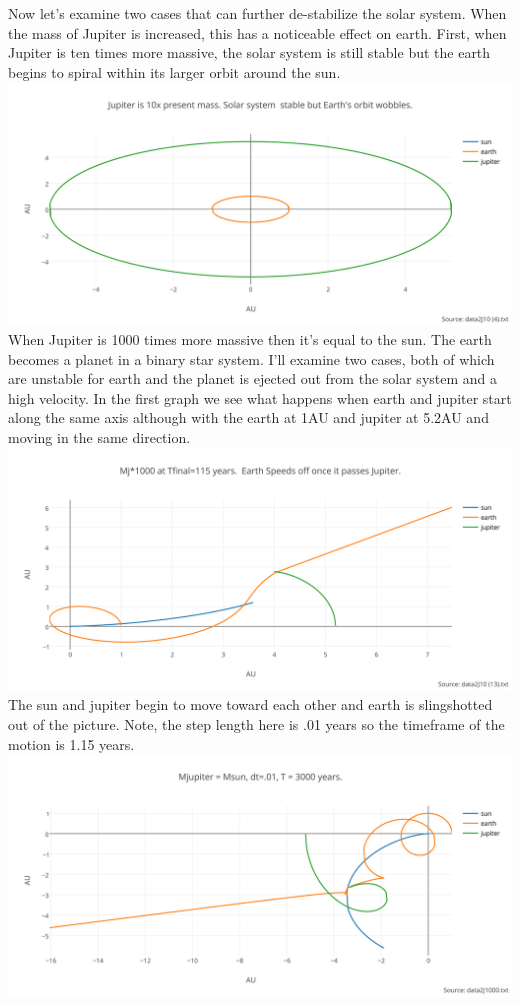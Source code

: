 \documentclass[11pt,a4wide]{article}
\begin{document}
\begin{enumerate}
Now let's examine two cases that can further de-stabilize the solar system. When the mass of Jupiter is increased, this has a noticeable effect on earth. First, when Jupiter is ten times more massive, the solar system is still stable but the earth begins to spiral within its larger orbit around the sun. 
\includegraphics[width=6in]{jupiter_is_10x_present_mass_solar_system_stable_but_earths_orbit_wobbles_.png}\\
When Jupiter is 1000 times more massive then it's equal to the sun. The earth becomes a planet in a binary star system. I'll examine two cases, both of which are unstable for earth and the planet is ejected out from the solar system and a high velocity. In the first graph we see what happens when earth and jupiter start along the same axis although with the earth at 1AU and jupiter at 5.2AU and moving in the same direction. 
\includegraphics[width=6in]{115yMJ1000.png}\\
The sun and jupiter begin to move toward each other and earth is slingshotted out of the picture. Note, the step length here is .01 years so the timeframe of the motion is 1.15 years. 
\includegraphics[width=6in]{MJ1000.png}\\

\end{enumerate}
\end{document}
